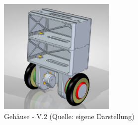 
\begin{figure}[!h]  %
	\centering\includegraphics[width=0.5\textwidth]{images/gehaeuse-v2.png}
	\caption{Gehäuse - V.2 \newline (Quelle: eigene Darstellung)}
	\label{gehaeuse-v3} %
\end{figure}


\pagebreak
